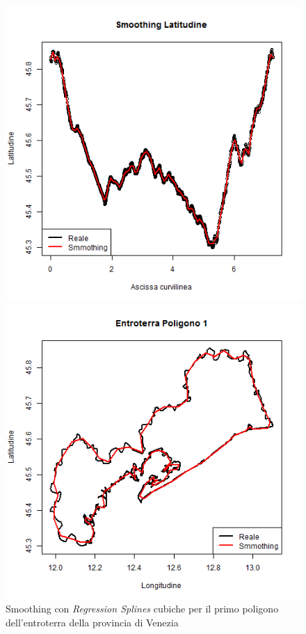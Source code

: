 \documentclass[a4paper,11pt,twoside,openright]{book}							%
\begin{document}
\begin{figure}[!t]
\begin{minipage}{.32\textwidth}
\includegraphics[width=\textwidth]{Immagini/Latitudine.png}
\end{minipage}%
\begin{minipage}{.64\textwidth}
\includegraphics[width=\textwidth]{Immagini/Regione.png}
\end{minipage}
\caption{Smoothing con \textit{Regression Splines} cubiche per il primo poligono dell'entroterra della provincia di Venezia}
\label{fig:smooth_ent_1}
\end{figure}
\end{document}
